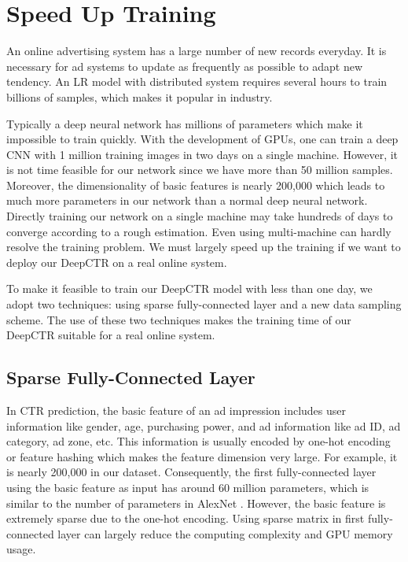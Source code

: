 \documentclass{sig-alternate}
\begin{document}
\section{Speed Up Training}
An online advertising system has a large number of new records everyday. It is necessary for ad systems  to update as frequently as possible to adapt  new tendency. An LR model with distributed system requires several hours to train billions of samples, which makes it popular in industry.

Typically a deep neural network has millions of parameters which make it impossible to train quickly. With the development of GPUs, one can train a deep CNN with 1 million training images in two days on a single machine. However, it is not time feasible for our network since we have more than 50 million samples. Moreover, the dimensionality of basic features is nearly 200,000 which leads to much more parameters in our network than a normal deep neural network. Directly training our network on a single machine may take hundreds of days to converge according to a rough estimation. Even using multi-machine can hardly resolve the training problem. We must largely speed up the training if we want to deploy our DeepCTR on a real online system. 

To make it feasible to train our DeepCTR model with less than one day, we adopt two techniques: using sparse fully-connected layer and a new data sampling scheme. The use of these two techniques makes the training time of our DeepCTR suitable for a real online system.
\subsection{Sparse Fully-Connected Layer}
In CTR prediction, the basic feature of an ad impression includes user information like gender, age, purchasing power, and ad information like ad ID, ad category, ad zone, etc. This information is usually encoded by one-hot encoding or feature hashing \cite{weinberger2009feature} which makes the feature dimension very large. For example, it is nearly 200,000 in our dataset. Consequently, the first fully-connected layer using the basic feature as input has around 60 million parameters, which is similar to the number of  parameters in  AlexNet \cite{NIPS2012_4824}. However, the basic feature is extremely sparse due to the one-hot encoding. Using sparse matrix in first fully-connected layer can largely reduce the computing complexity and GPU memory usage.
\end{document}
